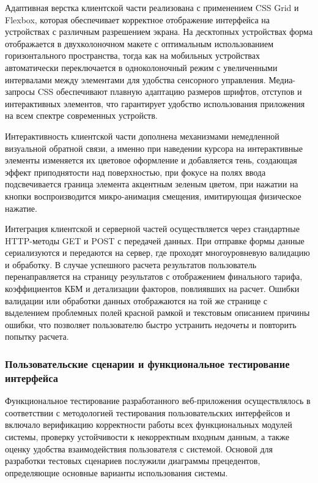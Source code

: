 Адаптивная верстка клиентской части реализована с применением CSS Grid и Flexbox, которая обеспечивает корректное отображение интерфейса на устройствах с различным разрешением экрана. На десктопных устройствах форма отображается в двухколоночном макете с оптимальным использованием горизонтального пространства, тогда как на мобильных устройствах автоматически переключается в одноколоночный режим с увеличенными интервалами между элементами для удобства сенсорного управления. Медиа-запросы CSS обеспечивают плавную адаптацию размеров шрифтов, отступов и интерактивных элементов, что гарантирует удобство использования приложения на всем спектре современных устройств.

Интерактивность клиентской части дополнена механизмами немедленной визуальной обратной связи,  а именно при наведении курсора на интерактивные элементы изменяется их цветовое оформление и добавляется тень, создающая эффект приподнятости над поверхностью, при фокусе на полях ввода подсвечивается граница элемента акцентным зеленым цветом, при нажатии на кнопки воспроизводится микро-анимация смещения, имитирующая физическое нажатие. 

Интеграция клиентской и серверной частей осуществляется через стандартные HTTP-методы GET и POST с передачей данных. При отправке формы данные сериализуются и передаются на сервер, где проходят многоуровневую валидацию и обработку. В случае успешного расчета результатов пользователь перенаправляется на страницу результатов с отображением финального тарифа, коэффициентов КБМ и детализации факторов, повлиявших на расчет. Ошибки валидации или обработки данных отображаются на той же странице с выделением проблемных полей красной рамкой и текстовым описанием причины ошибки, что позволяет пользователю быстро устранить недочеты и повторить попытку расчета.

\subsubsection{Пользовательские сценарии и функциональное тестирование интерфейса}

Функциональное тестирование разработанного веб-приложения осуществлялось в соответствии с методологией тестирования пользовательских интерфейсов и включало верификацию корректности работы всех функциональных модулей системы, проверку устойчивости к некорректным входным данным, а также оценку удобства взаимодействия пользователя с системой. Основой для разработки тестовых сценариев послужили диаграммы прецедентов, определяющие основные варианты использования системы.

